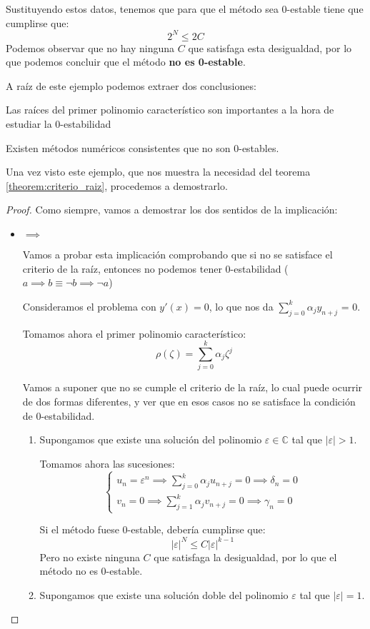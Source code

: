 \documentclass{apuntes}
\begin{document}
\begin{example}
Sustituyendo estos datos, tenemos que para que el método sea 0-estable tiene que cumplirse que:
\[2^N \leq 2C\]
Podemos observar que no hay ninguna $C$ que satisfaga esta desigualdad, por lo que podemos concluir que el método \textbf{no es 0-estable}.
\end{example}

A raíz de este ejemplo podemos extraer dos conclusiones:

\obs Las raíces del primer polinomio característico son importantes a la hora de estudiar la 0-estabilidad

\obs Existen métodos numéricos consistentes que no son 0-estables.

Una vez visto este ejemplo, que nos muestra la necesidad del teorema \ref{theorem:criterio_raiz}, procedemos a demostrarlo.
\begin{proof}
Como siempre, vamos a demostrar los dos sentidos de la implicación:
\begin{itemize}
\item $\implies$

Vamos a probar esta implicación comprobando que si no se satisface el criterio de la raíz, entonces no podemos tener 0-estabilidad ($a \implies b \equiv \neg b \implies \neg a$)

Consideramos el problema con $y'(x)=0$, lo que nos da $\sum_{j=0}^kα_jy_{n+j}$ = 0.

Tomamos ahora el primer polinomio característico:
\[ρ(ζ) = \sum_{j=0}^kα_jζ^j\]

Vamos a suponer que no se cumple el criterio de la raíz, lo cual puede ocurrir de dos formas diferentes, y ver que en esos casos no se satisface la condición de 0-estabilidad.
\begin{enumerate}
\item Supongamos que existe una solución del polinomio $ε∈ℂ$ tal que $|ε| >1$.

Tomamos ahora las sucesiones:
\[\left\{ \begin{array}{l}u_n = ε^n \implies \sum_{j=0}^kα_ju_{n+j} = 0 \implies δ_n = 0 \\
v_n = 0 \implies \sum_{j=1}^kα_jv_{n+j}=0 \implies γ_n=0 \end{array}\right.\]

Si el método fuese 0-estable, debería cumplirse que:
\[|ε|^N \leq C |ε|^{k-1}\]
Pero no existe ninguna $C$ que satisfaga la desigualdad, por lo que el método no es 0-estable.

\item Supongamos que existe una solución doble del polinomio $ε$ tal que $|ε|=1$. 


\end{enumerate}
\end{itemize}
\end{proof}
\end{document}
